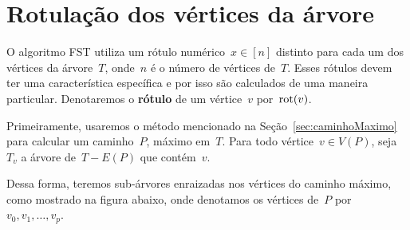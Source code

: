 \section {Rotulação dos vértices da árvore}
\label{sec:rotulacao}

	O algoritmo FST utiliza um 
	rótulo numérico~$x\in [n]$ distinto para cada um dos vértices 
	da árvore~$T$, onde~$n$ é o número de vértices de~$T$. 
	Esses rótulos devem ter uma característica específica e por isso
	são calculados de uma maneira particular.
	Denotaremos o \textbf{rótulo} de um vértice~$v$ por~$\mathrm{rot}(v)$.

	Primeiramente, usaremos o método mencionado na 
	Seção~\ref{sec:caminhoMaximo} para calcular 
	um caminho~$P$, máximo em~$T$. 
	Para todo vértice~$v\in V(P)$, 
	seja~$T_v$ a árvore de~$T-E(P)$ que contém~$v$.

	Dessa forma, teremos sub-árvores enraizadas nos vértices do
	caminho máximo, como mostrado na figura abaixo, onde denotamos
	os vértices de~$P$ por~${v_0,v_1,\ldots,v_p}$.
	


